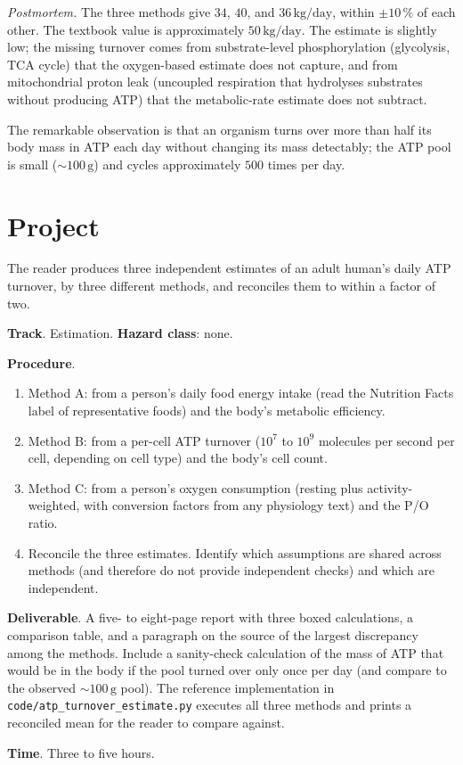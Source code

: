 \begin{estimation}
\smallskip
\textit{Postmortem.} The three methods give $34$, $40$, and
$36\,\text{kg}/\text{day}$, within $\pm 10\,\%$ of each other. The
textbook value is approximately $50\,\text{kg}/\text{day}$. The
estimate is slightly low; the missing turnover comes from
substrate-level phosphorylation (glycolysis, TCA cycle) that the
oxygen-based estimate does not capture, and from mitochondrial
proton leak (uncoupled respiration that hydrolyses substrates
without producing ATP) that the metabolic-rate estimate does not
subtract.

The remarkable observation is that an organism turns over more than
half its body mass in ATP each day without changing its mass
detectably; the ATP pool is small ($\sim 100\,\text{g}$) and
cycles approximately $500$ times per day.
\end{estimation}

\section{Project}

\begin{project}
The reader produces three independent estimates of an adult human's
daily ATP turnover, by three different methods, and reconciles them
to within a factor of two.

\textbf{Track}. Estimation.
\textbf{Hazard class}: none.

\textbf{Procedure}.

\begin{enumerate}[leftmargin=*]
\item Method A: from a person's daily food energy intake (read the
  Nutrition Facts label of representative foods) and the body's
  metabolic efficiency.
\item Method B: from a per-cell ATP turnover ($10^7$ to $10^9$ molecules
  per second per cell, depending on cell type) and the body's cell
  count.
\item Method C: from a person's oxygen consumption (resting plus
  activity-weighted, with conversion factors from any physiology text)
  and the P/O ratio.
\item Reconcile the three estimates. Identify which assumptions are
  shared across methods (and therefore do not provide independent
  checks) and which are independent.
\end{enumerate}

\textbf{Deliverable}. A five- to eight-page report with three boxed
calculations, a comparison table, and a paragraph on the source of the
largest discrepancy among the methods. Include a sanity-check
calculation of the mass of ATP that would be in the body if the pool
turned over only once per day (and compare to the observed
$\sim 100\,\text{g}$ pool). The reference implementation in
\texttt{code/atp\_turnover\_estimate.py} executes all three methods
and prints a reconciled mean for the reader to compare against.

\textbf{Time}. Three to five hours.
\end{project}

